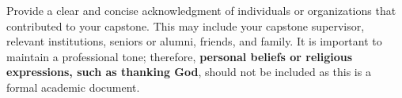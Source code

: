 Provide a clear and concise acknowledgment of individuals or organizations that contributed to your capstone. This may include your capstone supervisor, relevant institutions, seniors or alumni, friends, and family. It is important to maintain a professional tone; therefore, \textbf{personal beliefs or religious expressions, such as thanking God}, should not be included as this is a formal academic document.